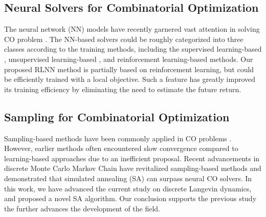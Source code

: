 \subsection{Neural Solvers for Combinatorial Optimization}
The neural network (NN) models have recently garnered vast attention in solving CO problem \citep{bengio2020machine}. The NN-based solvers could be roughly categorized into three classes according to the training methods, including  the supervised learning-based  \citep{Li2018CombinatorialOW, GasseCFCL19, sun2023difusco, li2023from, li2024fast}, unsupervised learning-based \citep{Karalias2020ErdosGN, wang2022unsupervised, wang2023unsupervised, zhang2023let, SanokowskiHL24}, and reinforcement learning-based \citep{Khalil2017DQNCO, qiu2022dimes} methods. Our proposed RLNN method is partially based on reinforcement learning, but could be efficiently trained with a local objective. Such a feature has greatly improved its training efficiency by eliminating the need to estimate the future return.


\subsection{Sampling for Combinatorial Optimization}
Sampling-based methods \citep{Metropolis1953EquationOS, Hastings1970MonteCS, Neal1996SamplingFM, IBA_2001} have been commonly applied in CO problems \citep{tsp_sample, Bhattacharya2014SimulatedAA, TAVAKKOLIMOGHADDAM2007406, SECKINER200731, Chen2004MultiobjectiveVP}. However, earlier methods often encountered slow convergence compared to learning-based approaches due to an inefficient proposal. Recent advancements in discrete Monte Carlo Markov Chain \citep{Grathwohl2021OopsIT, zhang2022langevinlike, sun2022path} have revitalized sampling-based methods and  \citet{sun2023revisiting} demonstrated that simulated annealing (SA) can surpass neural CO solvers. In this work, we have advanced the current study on discrete Langevin dynamics, and proposed a novel SA algorithm. Our conclusion supports the previous study the further advances the development of the field.

